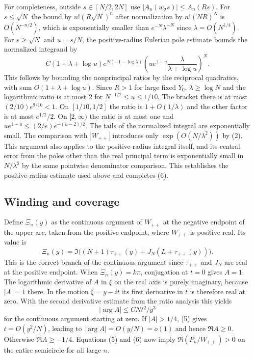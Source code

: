 \documentclass[11pt]{article}
\begin{document}
For completeness, outside $s\in[N/2,2N]$ use $|A_n(w_\sigma s)|\le A_n(Rs)$. For $s\le\sqrt N$ the bound by $n!(R\sqrt N)^n$ after normalization by $n!(NR)^N$ is $O(N^{-n/2})$, which is exponentially smaller than $e^{-N}\lambda^{-N}$ since $\lambda=O(N^{1/4})$. For $s\ge\sqrt N$ and $u=s/N$, the positive-radius Eulerian pole estimate bounds the normalized integrand by
\[
 C(1+\lambda+\log u)e^{N(-1-\log\lambda)}
 \left(u e^{1-u}\frac{\lambda}{\lambda+\log u}\right)^N.
\]
This follows by bounding the nonprincipal ratios by the reciprocal quadratics, with sum $O(1+\lambda+\log u)$. Since $R>1$ for large fixed $Y_0$, $\lambda\ge\log N$ and the logarithmic ratio is at most $2$ for $N^{-1/2}\le u\le1/10$. The bracket there is at most $(2/10)e^{9/10}<1$. On $[1/10,1/2]$ the ratio is $1+O(1/\lambda)$ and the other factor is at most $e^{1/2}/2$. On $[2,\infty)$ the ratio is at most one and $u e^{1-u}\le(2/e)e^{-(u-2)/2}$. The tails of the normalized integral are exponentially small. The comparison with $|W_{++}|$ introduces only $\exp(O(N/\lambda^2))$ by (2). This argument also applies to the positive-radius integral itself, and its central error from the poles other than the real principal term is exponentially small in $N/\lambda^2$ by the same pointwise denominator comparison. This establishes the positive-radius estimate used above and completes (6).

\subsection{Winding and coverage}

Define $\Xi_n(y)$ as the continuous argument of $W_{++}$ at the negative endpoint of the upper arc, taken from the positive endpoint, where $W_{++}$ is positive real. Its value is
\[
 \Xi_n(y)=\Im\big((N+1)\tau_{++}(y)+J_N(L+\tau_{++}(y))\big).
\]
This is the correct branch of the continuous argument since $\tau_{++}$ and $J_N$ are real at the positive endpoint. When $\Xi_n(y)=k\pi$, conjugation at $t=0$ gives $A=1$. The logarithmic derivative of $A$ in $\xi$ on the real axis is purely imaginary, because $|A|=1$ there. In the motion $\xi=y-it$ its first derivative in $t$ is therefore real at zero. With the second derivative estimate from the ratio analysis this yields
\[
 |\arg A|\le C N t^2/y^3
\]
for the continuous argument starting at zero. If $|A|>1/4$, (5) gives $t=O(y^2/N)$, leading to $|\arg A|=O(y/N)=o(1)$ and hence $\Re A\ge0$. Otherwise $\Re A\ge-1/4$. Equations (5) and (6) now imply $\Re(P_n/W_{++})>0$ on the entire semicircle for all large $n$.
\end{document}
